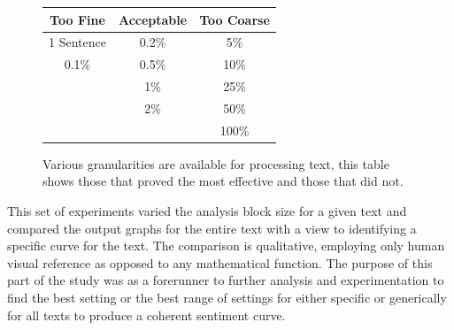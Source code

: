 \documentclass{article}
\begin{document}
        \begin{figure}[hbt]
            \begin{center}
                \begin{tabular}{ |c|c|c| } 
                \hline
                \textbf{Too Fine} & \textbf{Acceptable} & \textbf{Too Coarse} \\ 
                \hline
                1 Sentence & 0.2\% & 5\% \\ 
                0.1\% & 0.5\% & 10\% \\
                & 1\% & 25\% \\
                & 2\% & 50\% \\
                &  & 100\% \\        
                \hline
                \end{tabular}
            \end{center}
            \centering
            \caption{Various granularities are available for processing text, this table shows those that proved the most effective and those that did not.}
            \label{fig:granChart}
        \end{figure}
        This set of experiments varied the analysis block size for a given text and compared the output graphs for the entire text with a view to identifying a specific curve for the text. The comparison is qualitative, employing only human visual reference as opposed to any mathematical function. The purpose of this part of the study was as a forerunner to further analysis and experimentation to find the best setting or the best range of settings for either specific or generically for all texts to produce a coherent sentiment curve.
\end{document}
